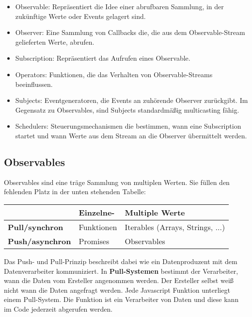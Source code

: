 \begin{itemize}
    \item Observable: Repräsentiert die Idee einer abrufbaren Sammlung, in der zukünftige Werte oder Events gelagert sind.
    \item Observer: Eine Sammlung von Callbacks die, die  aus dem Observable-Stream gelieferten Werte, abrufen.
    \item Subscription: Repräsentiert das Aufrufen eines Observable.
    \item Operators: Funktionen, die das Verhalten von Observable-Streams beeinflussen.
    \item Subjects: Eventgeneratoren, die Events an zuhörende Observer zurückgibt. Im Gegensatz zu Observables, sind Subjects standardmäßig multicasting fähig.
    \item Schedulers: Steuerungsmechanismen die bestimmen, wann eine Subscription startet und wann Werte aus dem Stream an die Observer übermittelt werden.
\end{itemize}

\subsection{Observables}

Observables sind eine träge Sammlung von multiplen Werten. Sie füllen den fehlenden Platz in der unten stehenden Tabelle:

\begin{center}
    \begin{tabular}{| l | l | l |}
    \hline
    & \textbf{Einzelne-} & \textbf{Multiple Werte} \\ \hline
    \textbf{Pull/synchron} & Funktionen & Iterables (Arrays, Strings, ...) \\ \hline
    \textbf{Push/asynchron} & Promises & Observables  \\ \hline
    \end{tabular}
\end{center}

\noindent
Das Push- und Pull-Prinzip beschreibt dabei wie ein Datenproduzent mit dem Datenverarbeiter kommuniziert. In \textbf{Pull-Systemen} bestimmt der Verarbeiter, wann die Daten vom Ersteller angenommen werden. Der Ersteller selbst weiß nicht wann die Daten angefragt werden. Jede Javascript Funktion unterliegt einem Pull-System. Die Funktion ist ein Verarbeiter von Daten und diese kann im Code jederzeit abgerufen werden.\\

